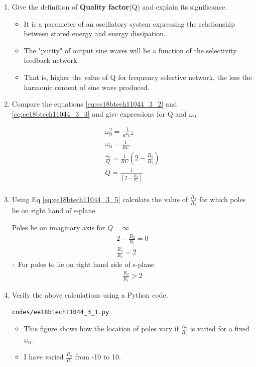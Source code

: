 \begin{enumerate}[label=\arabic*.,ref=\theenumi]
\item Give the definition of \textbf{Quality factor}(Q) and explain its significance.

\solution
\begin{itemize}
    \item It is a parameter of an oscillatory system expressing the relationship between stored energy and energy dissipation.
    \item The "purity" of output sine waves will be a function of the selectivity feedback network.
    \item That is, higher the value of Q for frequency selective network, the less the harmonic content of sine wave produced.
\end{itemize}
 


\item 
Compare the equations \ref{eq:ee18btech11044_3_2} and \ref{eq:ee18btech11044_3_3} and give expressions for Q and $\omega_0$

\solution
\begin{align}
    \omega_0^2 = \frac{1}{R^2C^2} \\
    \omega_0 = \frac{1}{RC} \label{eq:ee18btech11044_3_4} \\
    \frac{\omega_0}{Q} = \frac{1}{RC}(2 - \frac{R_2}{R_1}) \\
    Q = \frac{1}{(2 - \frac{R_2}{R_1})} \label{eq:ee18btech11044_3_5} \\
\end{align}
\item 
Using Eq \ref{eq:ee18btech11044_3_5} calculate the value of $\frac{R_2}{R_1}$ for which poles lie on right hand of s-plane.

\solution 

Poles lie on imaginary axis for $Q = \infty$
\begin{align}
    2 - \frac{R_2}{R_1} = 0 \\
    \frac{R_2}{R_1} = 2
\end{align}
$\therefore$ For poles to lie on right hand side of s-plane
\begin{align}
    \frac{R_2}{R_1} >2
\end{align}


\item
Verify the above calculations using a Python code.

\solution
\begin{lstlisting}
codes/ee18btech11044_3_1.py
\end{lstlisting}
\begin{itemize}
    \item This figure shows how the location of poles vary if $\frac{R_2}{R_1}$ is varied for a fixed $\omega_0$.
    \item I have varied $\frac{R_2}{R_1}$ from -10 to 10. 
\end{itemize}


\end{enumerate}
